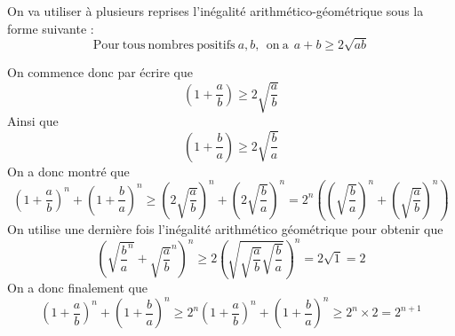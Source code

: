 \begin{sol}
On va utiliser à plusieurs reprises l'inégalité arithmético-géométrique sous la forme suivante :
$$\mathrm{Pour}\: \mathrm{tous}\: \mathrm{nombres}\: \mathrm{ positifs }\:a,b,\:\: \mathrm{on}\: \mathrm{a}\:\:a+b\geq 2\sqrt{ab} $$

On commence donc par écrire que
$$\left(1+\frac{a}{b}\right)\geq 2\sqrt{\frac{a}{b}} $$
Ainsi que
$$\left(1+\frac{b}{a}\right)\geq 2\sqrt{\frac{b}{a}} $$
On a donc montré que
$$\left(1+\frac{a}{b}\right)^n+\left(1+\frac{b}{a}\right)^n\geq \left(2\sqrt{\frac{a}{b}}\right)^n+\left(2\sqrt{\frac{b}{a}}\right)^n=2^n\left(\left(\sqrt{\frac{b}{a}}\right)^n+\left(\sqrt{\frac{a}{b}}\right)^n \right) $$
On utilise une dernière fois l'inégalité arithmético géométrique pour obtenir que
$$\left(\sqrt{\frac{b}{a}^n}+\sqrt{\frac{a}{b}}^n\right)^n\geq 2\left(\sqrt{\sqrt{\frac{a}{b}}\sqrt{\frac{b}{a}}}\right)^n=2\sqrt{1}=2 $$
On a donc finalement que
$$\left(1+\frac{a}{b}\right)^n+\left(1+\frac{b}{a}\right)^n\geq 2^n\left(1+\frac{a}{b}\right)^n+\left(1+\frac{b}{a}\right)^n \geq2^n\times 2=2^{n+1} $$
\end{sol}


